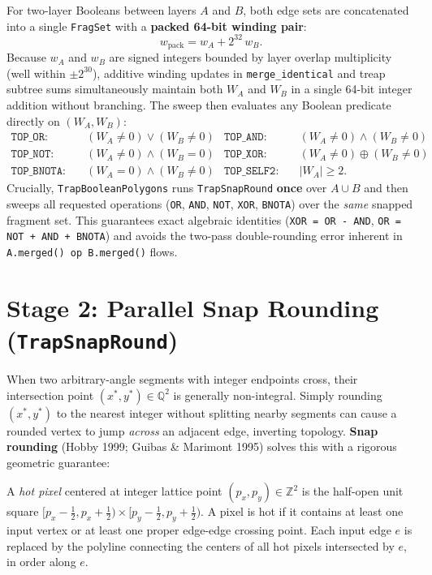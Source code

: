 For two-layer Booleans between layers $A$ and $B$, both edge sets are concatenated into a single \texttt{FragSet} with a \textbf{packed 64-bit winding pair}:
\begin{equation}
  w_{\text{pack}} = w_A + 2^{32}\,w_B.
\end{equation}
Because $w_A$ and $w_B$ are signed integers bounded by layer overlap multiplicity (well within $\pm 2^{30}$), additive winding updates in \texttt{merge\_identical} and treap subtree sums simultaneously maintain both $W_A$ and $W_B$ in a single 64-bit integer addition without branching. The sweep then evaluates any Boolean predicate directly on $(W_A, W_B)$:
\begin{align*}
  \texttt{TOP\_OR}:     &\quad (W_A \ne 0) \lor (W_B \ne 0) &
  \texttt{TOP\_AND}:    &\quad (W_A \ne 0) \land (W_B \ne 0) \\
  \texttt{TOP\_NOT}:    &\quad (W_A \ne 0) \land (W_B = 0) &
  \texttt{TOP\_XOR}:    &\quad (W_A \ne 0) \oplus (W_B \ne 0) \\
  \texttt{TOP\_BNOTA}:  &\quad (W_A = 0) \land (W_B \ne 0) &
  \texttt{TOP\_SELF2}:  &\quad |W_A| \ge 2.
\end{align*}
Crucially, \texttt{TrapBooleanPolygons} runs \texttt{TrapSnapRound} \textbf{once} over $A \cup B$ and then sweeps all requested operations (\texttt{OR}, \texttt{AND}, \texttt{NOT}, \texttt{XOR}, \texttt{BNOTA}) over the \emph{same} snapped fragment set. This guarantees exact algebraic identities (\texttt{XOR = OR - AND}, \texttt{OR = NOT + AND + BNOTA}) and avoids the two-pass double-rounding error inherent in \texttt{A.merged() op B.merged()} flows.

\section{Stage 2: Parallel Snap Rounding (\texttt{TrapSnapRound})}

When two arbitrary-angle segments with integer endpoints cross, their intersection point $(x^*, y^*) \in \mathbb{Q}^2$ is generally non-integral. Simply rounding $(x^*, y^*)$ to the nearest integer without splitting nearby segments can cause a rounded vertex to jump \emph{across} an adjacent edge, inverting topology. \textbf{Snap rounding} (Hobby 1999; Guibas \& Marimont 1995) solves this with a rigorous geometric guarantee:

\begin{definition}
A \emph{hot pixel} centered at integer lattice point $(p_x, p_y) \in \mathbb{Z}^2$ is the half-open unit square $[p_x - \tfrac{1}{2}, p_x + \tfrac{1}{2}) \times [p_y - \tfrac{1}{2}, p_y + \tfrac{1}{2})$. A pixel is hot if it contains at least one input vertex or at least one proper edge-edge crossing point. Each input edge $e$ is replaced by the polyline connecting the centers of all hot pixels intersected by $e$, in order along $e$.
\end{definition}

